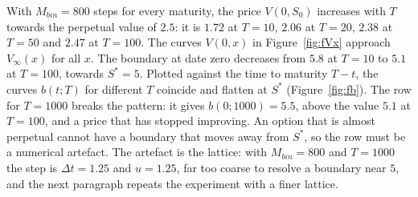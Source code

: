 With $M_{bin}=800$ steps for every maturity, the price $V(0,S_0)$ increases with $T$ towards the perpetual value of $2.5$: it is $1.72$ at $T=10$, $2.06$ at $T=20$, $2.38$ at $T=50$ and $2.47$ at $T=100$.
The curves $V(0,x)$ in Figure~\ref{fig:fVx} approach $V_\infty(x)$ for all $x$.
The boundary at date zero decreases from $5.8$ at $T=10$ to $5.1$ at $T=100$, towards $S^*=5$.
Plotted against the time to maturity $T-t$, the curves $b(t;T)$ for different $T$ coincide and flatten at $S^*$ (Figure~\ref{fig:fb}).
The row for $T=1000$ breaks the pattern: it gives $b(0;1000)=5.5$, above the value $5.1$ at $T=100$, and a price that has stopped improving.
An option that is almost perpetual cannot have a boundary that moves away from $S^*$, so the row must be a numerical artefact.
The artefact is the lattice: with $M_{bin}=800$ and $T=1000$ the step is $\Delta t=1.25$ and $u=1.25$, far too coarse to resolve a boundary near $5$, and the next paragraph repeats the experiment with a finer lattice.
